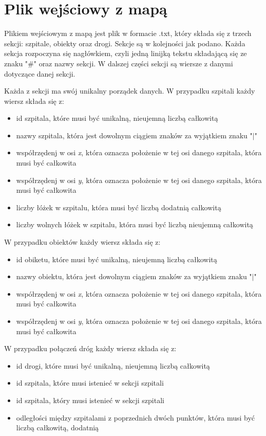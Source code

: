 \documentclass[10pt,a4paper]{article}
\begin{document}
\section{Plik wejściowy z mapą}

Plikiem wejściowym z mapą jest plik w formacie .txt, który składa się z trzech sekcji: szpitale, obiekty oraz drogi. Sekcje są w kolejności jak podano. Każda sekcja rozpoczyna się nagłówkiem, czyli jedną linijką tekstu składającą się ze znaku "\#" oraz nazwy sekcji. W dalszej części sekcji są wiersze z danymi dotyczące danej sekcji.

Każda z sekcji ma swój unikalny porządek danych. W przypadku szpitali każdy wiersz składa się z:
\begin{itemize}
\item id szpitala, które musi być unikalną, nieujemną liczbą całkowitą
\item nazwy szpitala, która jest dowolnym ciągiem znaków za wyjątkiem znaku "$\mid$"
\item współrzędenj w osi \textit{x}, która oznacza położenie w tej osi danego szpitala, która musi być całkowita
\item współrzędenj w osi \textit{y}, która oznacza położenie w tej osi danego szpitala, która musi być całkowita
\item liczby łóżek w szpitalu, która musi być liczbą dodatnią całkowitą
\item liczby wolnych łóżek w szpitalu, która musi być liczbą nieujemną całkowitą
\end{itemize}
W przypadku obiektów każdy wiersz składa się z:
\begin{itemize}
\item id obiketu, które musi być unikalną, nieujemną liczbą całkowitą
\item nazwy obiektu, która jest dowolnym ciągiem znaków za wyjątkiem znaku "$\mid$"
\item współrzędenj w osi \textit{x}, która oznacza położenie w tej osi danego szpitala, która musi być całkowita
\item współrzędenj w osi \textit{y}, która oznacza położenie w tej osi danego szpitala, która musi być całkowita
\end{itemize}
W przypadku połączeń dróg każdy wiersz składa się z:
\begin{itemize}
\item id drogi, które musi być unikalną, nieujemną liczbą całkowitą
\item id szpitala, które musi istenieć w sekcji szpitali
\item id szpitala, który musi istenieć w sekcji szpitali
\item odległości między szpitalami z poprzednich dwóch punktów, która musi być liczbą całkowitą, dodatnią
\end{itemize}
\end{document}
